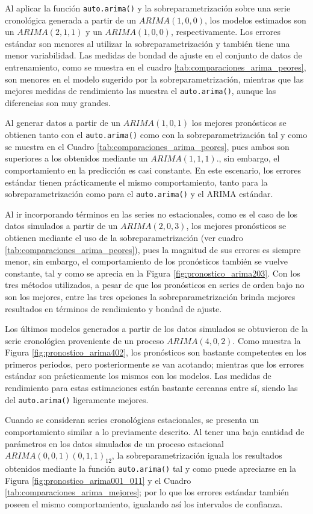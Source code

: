 \documentclass[
]{article}
\begin{document}
Al aplicar la función \texttt{auto.arima()} y la sobreparametrización
sobre una serie cronológica generada a partir de un \(ARIMA(1,0,0)\),
los modelos estimados son un \(ARIMA(2,1,1)\) y un \(ARIMA(1,0,0)\),
respectivamente. Los errores estándar son menores al utilizar la
sobreparametrización y también tiene una menor variabilidad. Las medidas
de bondad de ajuste en el conjunto de datos de entrenamiento, como se
muestra en el cuadro \ref{tab:comparaciones_arima_peores}, son menores
en el modelo sugerido por la sobreparametrización, mientras que las
mejores medidas de rendimiento las muestra el \texttt{auto.arima()},
aunque las diferencias son muy grandes.

Al generar datos a partir de un \(ARIMA(1,0,1)\) los mejores pronósticos
se obtienen tanto con el \texttt{auto.arima()} como con la
sobreparametrización tal y como se muestra en el Cuadro
\ref{tab:comparaciones_arima_peores}, pues ambos son superiores a los
obtenidos mediante un \(ARIMA(1,1,1)\)., sin embargo, el comportamiento
en la predicción es casi constante. En este escenario, los errores
estándar tienen prácticamente el mismo comportamiento, tanto para la
sobreparametrización como para el \texttt{auto.arima()} y el ARIMA
estándar.

Al ir incorporando términos en las series no estacionales, como es el
caso de los datos simulados a partir de un \(ARIMA(2,0,3)\), los mejores
pronósticos se obtienen mediante el uso de la sobreparametrización (ver
cuadro \ref{tab:comparaciones_arima_peores}), pues la magnitud de sus
errores es siempre menor, sin embargo, el comportamiento de los
pronósticos también se vuelve constante, tal y como se aprecia en la
Figura \ref{fig:pronostico_arima203}. Con los tres métodos utilizados, a
pesar de que los pronósticos en series de orden bajo no son los mejores,
entre las tres opciones la sobreparametrización brinda mejores
resultados en términos de rendimiento y bondad de ajuste.

Los últimos modelos generados a partir de los datos simulados se
obtuvieron de la serie cronológica proveniente de un proceso
\(ARIMA(4,0,2)\). Como muestra la Figura \ref{fig:pronostico_arima402},
los pronósticos son bastante competentes en los primeros periodos, pero
posteriormente se van acotando; mientras que los errores estándar son
prácticamente los mismos con los modelos. Las medidas de rendimiento
para estas estimaciones están bastante cercanas entre sí, siendo las del
\texttt{auto.arima()} ligeramente mejores.

Cuando se consideran series cronológicas estacionales, se presenta un
comportamiento similar a lo previamente descrito. Al tener una baja
cantidad de parámetros en los datos simulados de un proceso estacional
\(ARIMA(0,0,1)(0,1,1)_{12}\), la sobreparametrización iguala los
resultados obtenidos mediante la función \texttt{auto.arima()} tal y
como puede apreciarse en la Figura \ref{fig:pronostico_arima001_011} y
el Cuadro \ref{tab:comparaciones_arima_mejores}; por lo que los errores
estándar también poseen el mismo comportamiento, igualando así los
intervalos de confianza.
\end{document}
